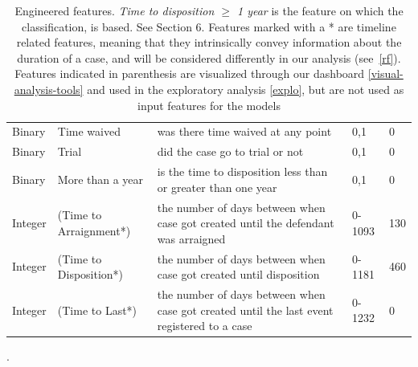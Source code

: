 \documentclass{AISB2008}
\begin{document}
\begin{table}
\begin{tabular}{llp{8cm}p{5cm}l}
Binary      & Time waived          & was there time waived at any point                                                                      & 0,1                                                                                                                               & 0              \\
Binary      & Trial                & did the case go to trial or not                                                                         & 0,1                                                                                                                               & 0              \\
Binary      & More than a year     & is the time to disposition less than or greater than one year                                           & 0,1                                                                                                                               & 0              \\
Integer     & (Time to Arraignment*) & the number of days between when case got created until the defendant was arraigned                      & 0-1093                                                                                                                            & 130            \\
Integer     & (Time to Disposition*) & the number of days between when case got created until disposition                                      & 0-1181                                                                                                                            & 460            \\
Integer     & (Time to Last*)       & the number of days between when case got created until the last event registered to a case              & 0-1232                                                                                                                            & 0             
\end{tabular}
\caption{Engineered features. \textit{Time to disposition $\geq$ 1
    year} is the feature on which the classification, is based. See
  Section 6. Features marked with a * are timeline related features,
  meaning that they intrinsically convey information about the
  duration of a case, and will be considered differently in
  our analysis (see~\autoref{rf}). Features indicated in parenthesis
  are visualized through our dashboard \autoref{visual-analysis-tools}
  and used in the exploratory analysis \autoref{explo}, but are not
  used as input features for the
  models}. \label{tab:Features} \end{table}
\end{document}
